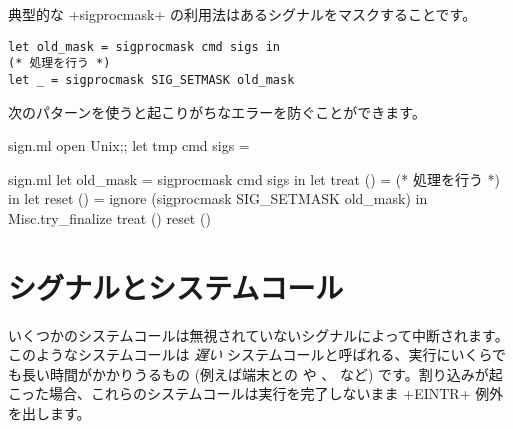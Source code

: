 %
典型的な \ml+sigprocmask+ の利用法はあるシグナルをマスクすることです。
%
\begin{lstlisting}
let old_mask = sigprocmask cmd sigs in
(* 処理を行う *)
let _ = sigprocmask SIG_SETMASK old_mask
\end{lstlisting}
%
次のパターンを使うと起こりがちなエラーを防ぐことができます。
%
\begin{codefile}{sign.ml}
open Unix;;
let tmp cmd sigs =
\end{codefile}
%
\begin{listingcodefile}{sign.ml}
let old_mask = sigprocmask cmd sigs in
let treat () = (* 処理を行う *) in
let reset () = ignore (sigprocmask SIG_SETMASK old_mask) in
Misc.try_finalize treat () reset ()
\end{listingcodefile}

\section{\label{sec/sigsyscalls}シグナルとシステムコール}

いくつかのシステムコールは無視されていないシグナルによって中断されます。このようなシステムコールは \emph{遅い} システムコールと呼ばれる、実行にいくらでも長い時間がかかりうるもの (例えば端末との \io や 、  など) です。割り込みが起こった場合、これらのシステムコールは実行を完了しないまま \ml+EINTR+ 例外を出します。

